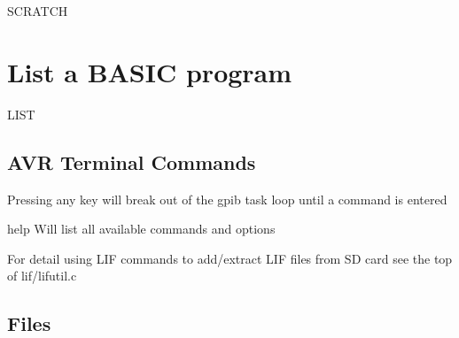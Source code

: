 \begin{DoxyPre}
  SCRATCH
\section*{List a BASIC program}\end{DoxyPre}



\begin{DoxyPre}
  LIST
\end{DoxyPre}
 



\subsection*{A\+VR Terminal Commands}


\begin{DoxyItemize}
\item Pressing any key will break out of the gpib task loop until a command is entered
\begin{DoxyItemize}
\item help Will list all available commands and options
\item For detail using L\+IF commands to add/extract L\+IF files from SD card see the top of lif/lifutil.\+c 


\end{DoxyItemize}
\end{DoxyItemize}

\subsection*{Files}



